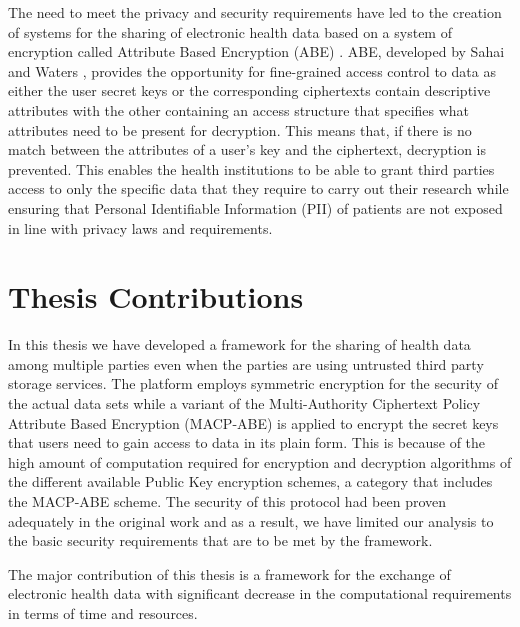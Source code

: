 The need to meet the privacy and security requirements have led to the creation of systems for the sharing of electronic health data based on a system of encryption called Attribute Based Encryption (ABE) \cite{Ibraimi2010}\cite{Narayan2010}\cite{Akinyele2010}\cite{Barua2011}\cite{Alshehri}\cite{Hupperich2012}\cite{Hsieh2012}\cite{Li2013}. ABE, developed by Sahai and Waters \cite{Sahai2005}, provides the opportunity for fine-grained access control to data as either the user secret keys or the corresponding ciphertexts contain descriptive attributes with the other containing an access structure that specifies what attributes need to be present for decryption. This means that, if there is no match between the attributes of a user's key and the ciphertext, decryption is prevented. This enables the health institutions to be able to grant third parties access to only the specific data that they require to carry out their research while ensuring that Personal Identifiable Information (PII) of patients are not exposed in line with privacy laws and requirements.



\section{Thesis Contributions}

In this thesis we have developed a framework for the sharing of health data among multiple parties even when the parties are using untrusted third party storage services. The platform employs symmetric encryption for the security of the actual data sets while a variant of the Multi-Authority Ciphertext Policy Attribute Based Encryption (MACP-ABE) is applied to encrypt the secret keys that users need to gain access to data in its plain form. This is because of the high amount of computation required for encryption and decryption algorithms of the different available Public Key encryption schemes, a category that includes the MACP-ABE scheme. The security of this protocol had been proven adequately in the original work \cite{Yang2014} and as a result, we have limited our analysis to the basic security requirements that are to be met by the framework.

The major contribution of this thesis is a framework for the exchange of electronic health data with significant decrease in the computational requirements in terms of time and resources.

